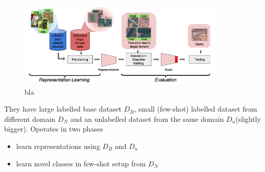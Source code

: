 \begin{figure}[ht]
\centering
\includegraphics[width=10cm]{startup_Figure1.png}
\caption{bla}
\end{figure}
They have large labelled base dataset $D_B$, small (few-shot) labelled dataset from different domain $D_N$ and an unlabelled dataset from the same domain $D_u$(slightly bigger).
Operates in two phases
\begin{itemize}[nosep]
\item learn representations using $D_B$ and $D_u$
\item learn novel classes in few-shot setup from $D_N$
\end{itemize}
